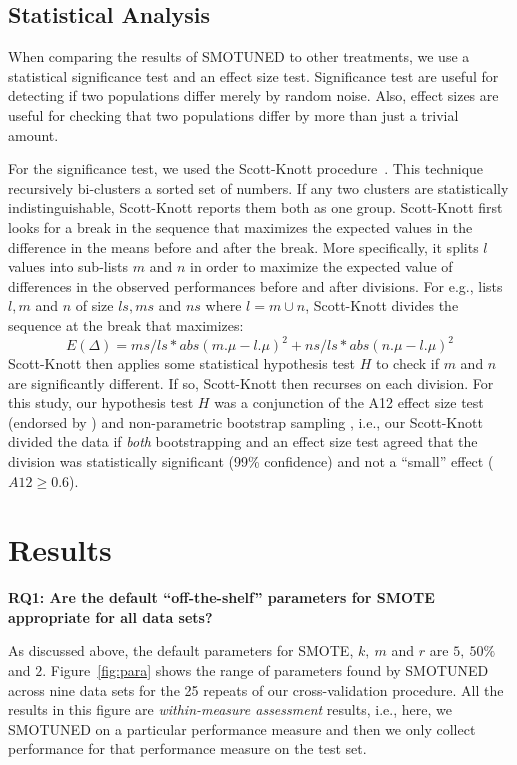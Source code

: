\documentclass[sigconf]{acmart}
\theoremstyle{break}
\newcommand{\sma}{{\sc SMOTE}}
\newcommand{\smb}{{\sc SMOTUNED}}
\begin{document}
\subsection{Statistical Analysis}
\label{sec:scott-knott}

When comparing the results of {\smb} to other
treatments, we use a statistical
significance test and an effect size test.
Significance test are useful for detecting if two populations
differ merely by random noise. 
Also, effect sizes are useful for checking that two populations differ by more than just a trivial amount.

For the significance test,  we used the 
     Scott-Knott procedure~\cite{mittas2013ranking,ghotra2015revisiting}. This
     technique recursively bi-clusters a sorted
    set of numbers. If any two clusters are statistically indistinguishable, Scott-Knott
    reports them both as one group.
    Scott-Knott first looks for a break in the sequence that maximizes the expected
    values in the difference in the means before and after the break.
    More specifically,  it  splits $l$ values into sub-lists $m$ and $n$ in order to maximize the expected value of differences  in the observed performances before and after divisions. For e.g., lists $l,m$ and $n$ of size $ls,ms$ and $ns$ where $l=m\cup n$, Scott-Knott divides the sequence at the break that maximizes:
     \[E(\Delta)=ms/ls*abs(m.\mu - l.\mu)^2 + ns/ls*abs(n.\mu - l.\mu)^2\]
Scott-Knott then applies some statistical hypothesis test $H$ to check if $m$ and $n$ are significantly different. If so, Scott-Knott then recurses on each division.
    For this study, our hypothesis test $H$ was a conjunction of the A12 effect size test (endorsed by
    \cite{arcuri2011practical})  and non-parametric bootstrap sampling \cite{efron94}, i.e., our Scott-Knott divided the data if {\em both}
    bootstrapping and an effect size test agreed that the division was statistically significant (99\% confidence) and not a ``small'' effect ($A12 \ge 0.6$).
   

\section{Results}
\label{sect:results}

{\bf RQ1: Are the default ``off-the-shelf'' parameters for SMOTE appropriate for all
 data sets?}
 
 As discussed above, the default parameters for
 {\sma}, $k,\ m$ and $r$ are $5,\ 50\%$ and $2$.
  Figure~\ref{fig:para} shows the range of parameters
 found by {\smb} across  nine data sets for the 25 repeats of our cross-validation procedure.
 All the results in this figure are {\em within-measure assessment} results, i.e.,
 here, we {\smb}  on a particular performance measure and then we only collect performance for that performance measure on the test set.
 
\end{document}
